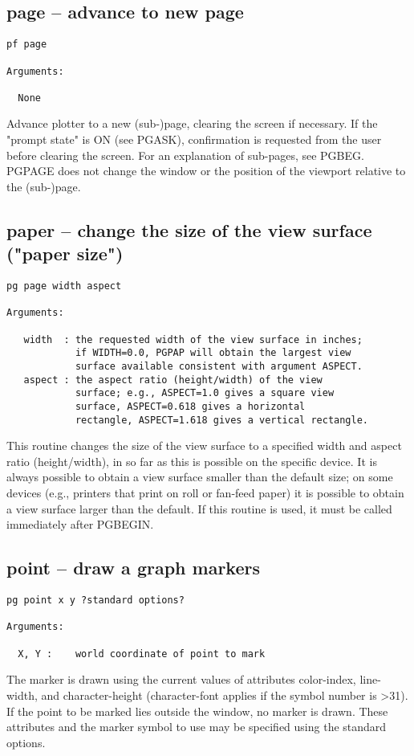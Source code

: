 \subsection{page -- advance to new page}
\begin{verbatim}
pf page

Arguments:

  None
\end{verbatim}
Advance plotter to a new (sub-)page, clearing the screen if
necessary. If the "prompt state" is ON (see PGASK), confirmation is
requested from the user before clearing the screen.  For an
explanation of sub-pages, see PGBEG.  PGPAGE does not change the
window or the position of the viewport relative to the (sub-)page.


\subsection{paper -- change the size of the view surface ("paper size")}
\begin{verbatim}
pg page width aspect

Arguments:

   width  : the requested width of the view surface in inches;
            if WIDTH=0.0, PGPAP will obtain the largest view
            surface available consistent with argument ASPECT.
   aspect : the aspect ratio (height/width) of the view
            surface; e.g., ASPECT=1.0 gives a square view
            surface, ASPECT=0.618 gives a horizontal
            rectangle, ASPECT=1.618 gives a vertical rectangle.
\end{verbatim}
This routine changes the size of the view surface to a specified
width and aspect ratio (height/width), in so far as this is possible
on the specific device. It is always possible to obtain a view
surface smaller than the default size; on some devices (e.g.,
printers that print on roll or fan-feed paper) it is possible
to obtain a view surface larger than the default. If this routine is
used, it must be called immediately after PGBEGIN.




\subsection{point -- draw a graph markers}
\begin{verbatim}
pg point x y ?standard options?

Arguments:

  X, Y :    world coordinate of point to mark
\end{verbatim}
The marker is drawn using the current values of attributes color-index,
line-width, and character-height (character-font applies if the symbol
number is >31).  If the point to be marked lies outside the window,
no marker is drawn.  These attributes and the marker symbol to use may be
specified using the standard options.


